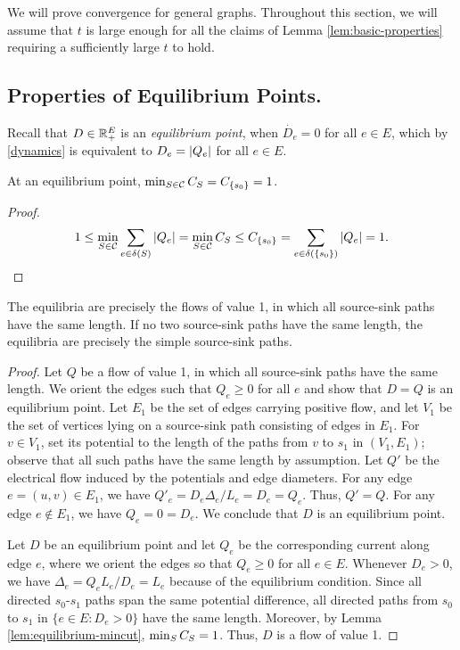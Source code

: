 \documentclass[11pt,a4paper]{article}
\newcommand{\Real}{\R}
\renewcommand{\source}{\ensuremath{s_0}}
\renewcommand{\sink}{\ensuremath{s_1}}
\newcommand{\negskip}{\vspace{-2em}\par}\newcommand{\Lnegskip}{\vspace{-3em}\par}
\begin{document}
We will prove convergence for general graphs. Throughout this section, we 
will assume that $t$ is large enough 
for all the claims of Lemma \ref{lem:basic-properties} requiring a sufficiently large $t$
to hold. 


\subsection{Properties of Equilibrium Points.}
Recall that $D \in \Real_+^E$ is an \emph{equilibrium point}, when $\dot{D_e}=0$ for all $e \in E$, which by \eqref{dynamics} is equivalent to $D_e = | Q_e |$ for all $e \in E$. 

\begin{lemma}
\label{lem:equilibrium-mincut}
At an equilibrium point, $\min_{S \in \calC} \capa(S) = \capa(\{s_0\}) = 1$.
\end{lemma}
\begin{proof} $$1 \le \min_{S \in \calC} \sum_{e \in \delta(S)} \abs{Q_e} = \min_{S \in \calC} \capa(S) \le \capa(\{s_0\}) = \sum_{e \in \delta(\{s_0\})} \abs{Q_e} = 1.$$ 
\negskip\end{proof}



\begin{lemma}\label{lem:characterization of equilibria} 
The equilibria are precisely the flows of value 1, in which all
source-sink paths have the same length. If no two source-sink paths have the
same length, the
equilibria are precisely the simple source-sink paths. 
\end{lemma}
\begin{proof} Let $Q$ be a flow of value 1, in which all source-sink paths have the
same length. We orient the edges such that $Q_e \ge 0$ for all $e$ and show
that $D = Q$ is an equilibrium point. Let $E_1$
be the set of edges carrying positive flow, and let $V_1$ be the set of vertices
lying on a source-sink path consisting of edges in $E_1$. For $v \in V_1$, set
its potential to the length of the paths from $v$ to $\sink$ in $(V_1,E_1)$;
observe that all such paths have the same length by assumption. Let $Q'$ be the
electrical flow induced by the potentials and edge diameters. For any 
edge $e
= (u,v) \in E_1$, we have $Q'_e = D_e \Delta_e/L_e = D_e = Q_e$. Thus, $Q' = Q$. For any edge $e
\not\in E_1$, we have $Q_e = 0 = D_e$. We conclude that $D$ is an equilibrium point. 


Let $D$ be an equilibrium point and let $Q_e$ be the corresponding current
along edge $e$, where we orient the edges so that $Q_e \ge 0$ for all $e \in
E$. Whenever $D_e>0$, we have $\Delta_e = Q_e L_e / D_e = L_e$ because of the
equilibrium condition. Since all directed $\source$-$\sink$ paths span the same
potential difference, all directed paths from $\source$ to $\sink$ in 
$\{e \in E : D_e > 0\}$ have the same length. Moreover, by Lemma
\ref{lem:equilibrium-mincut}, $\min_S \capa(S)=1$. Thus, $D$ is a flow of value 1.  
\end{proof}
\end{document}

